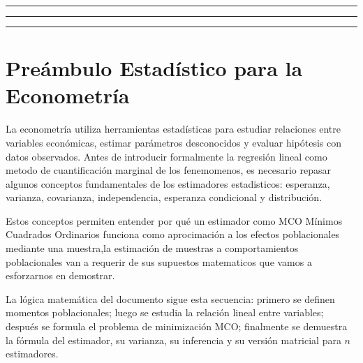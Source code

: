 \documentclass[11pt,a4paper]{article}
\begin{document}
\begin{titlepage}
\vfill
\begin{center}
\textcolor{ccdeblue}{\rule{0.18\textwidth}{1.5pt}}\hspace{0.5em}\textcolor{ccdelight}{\rule{0.18\textwidth}{1.5pt}}\hspace{0.5em}\textcolor{ccdeaccent}{\rule{0.18\textwidth}{1.5pt}}
\end{center}
\end{titlepage}


\begin{tcolorbox}[
enhanced,
breakable,
colback=white,
colframe=ccdeblue,
arc=2mm,
boxrule=0.8pt,
title={Contenido de la presentación},
fonttitle=\bfseries\large,
coltitle=white,
boxed title style={colback=ccdeblue,arc=1mm,boxrule=0pt},
attach boxed title to top left={yshift=-2mm,xshift=3mm},
borderline west={3pt}{0pt}{ccdeaccent}
]
\tableofcontents
\end{tcolorbox}

\newpage

\section{Preámbulo Estadístico para la Econometría}

La econometría utiliza herramientas estadísticas para estudiar relaciones entre variables económicas, estimar parámetros desconocidos y evaluar hipótesis con datos observados. Antes de introducir formalmente la regresión lineal como metodo de cuantificación marginal de los fenemomenos, es necesario repasar algunos conceptos fundamentales de los estimadores estadisticos: esperanza, varianza, covarianza, independencia, esperanza condicional y distribución.

Estos conceptos permiten entender por qué un estimador como MCO Mínimos Cuadrados Ordinarios funciona como aprocimación a los efectos poblacionales mediante una muestra,la estimación de muestras a comportamientos poblacionales van a requerir de sus supuestos matematicos que vamos a esforzarnos en demostrar.

\begin{observacion}
La lógica matemática del documento sigue esta secuencia: primero se definen momentos poblacionales; luego se estudia la relación lineal entre variables; después se formula el problema de minimización MCO; finalmente se demuestra la fórmula del estimador, su varianza, su inferencia y su versión matricial para $n$ estimadores.
\end{observacion}
\end{document}
